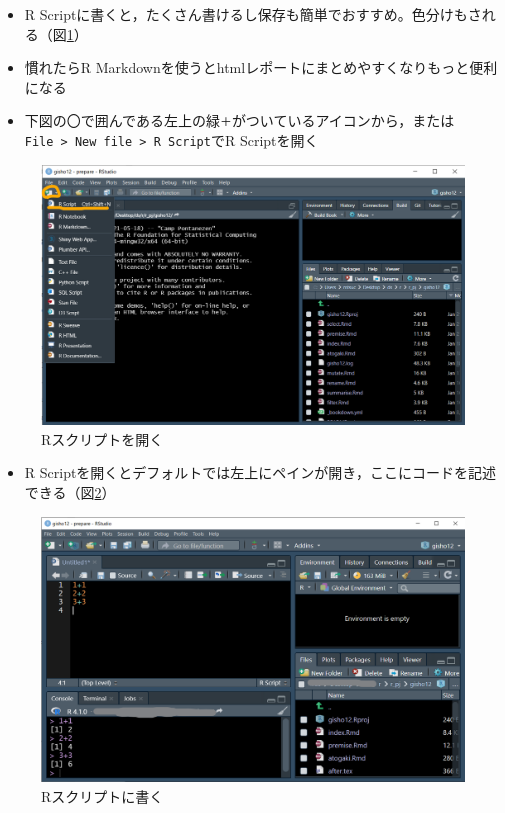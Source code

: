 \documentclass[
  xelatex,ja=standard, b5paper]{bxjsbook}
\providecommand{\tightlist}{%
  \setlength{\itemsep}{0pt}\setlength{\parskip}{0pt}}
\begin{document}
\begin{itemize}
\tightlist
\item
  R Scriptに書くと，たくさん書けるし保存も簡単でおすすめ。色分けもされる（図\ref{fig:script}）
\item
  慣れたらR Markdownを使うとhtmlレポートにまとめやすくなりもっと便利になる
\item
  下図の〇で囲んである左上の緑\texttt{＋}がついているアイコンから，または\texttt{File\ \textgreater{}\ New\ file\ \textgreater{}\ R\ Script}でR Scriptを開く
\end{itemize}

\begin{figure}

{\centering \includegraphics[width=0.7\linewidth]{images/newfile} 

}

\caption{Rスクリプトを開く}\label{fig:script}
\end{figure}

\begin{itemize}
\tightlist
\item
  R Scriptを開くとデフォルトでは左上にペインが開き，ここにコードを記述できる（図\ref{fig:script2}）
\end{itemize}

\begin{figure}

{\centering \includegraphics[width=0.7\linewidth]{images/rscript} 

}

\caption{Rスクリプトに書く}\label{fig:script2}
\end{figure}
\end{document}
